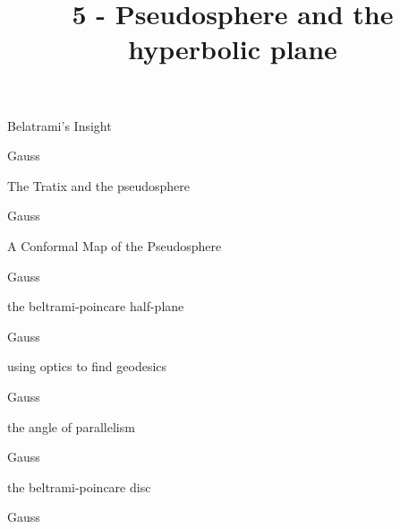 \documentclass{article}
\title{5 - Pseudosphere and the hyperbolic plane}
\newenvironment{andrew_section}[1]
    {
    \section{#1}
    \begin{itemize}
    }
    {
    \end{itemize}
    }
\begin{document}
\maketitle

\begin{andrew_section}{Belatrami's Insight}
    \item 
        Gauss
\end{andrew_section}

\begin{andrew_section}{The Tratix and the pseudosphere}
    \item 
        Gauss
\end{andrew_section}

\begin{andrew_section}{A Conformal Map of the Pseudosphere}
    \item 
        Gauss
\end{andrew_section}

\begin{andrew_section}{the beltrami-poincare half-plane}
    \item 
        Gauss
\end{andrew_section}

\begin{andrew_section}{using optics to find geodesics}
    \item 
        Gauss
\end{andrew_section}

\begin{andrew_section}{the angle of parallelism}
    \item 
        Gauss
\end{andrew_section}

\begin{andrew_section}{the beltrami-poincare disc}
    \item 
        Gauss
\end{andrew_section}
\end{document}
